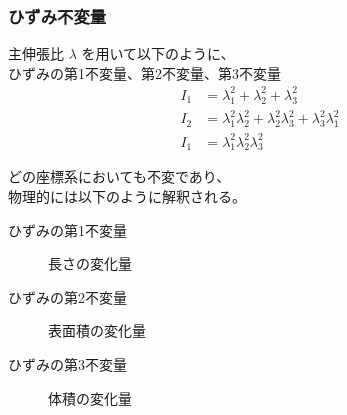 \documentclass[12pt, dvipdfmx]{beamer}
\begin{document}
\begin{frame}
	\frametitle{ひずみ不変量}

	主伸張比 $\lambda$ を用いて以下のように、\\ひずみの第1不変量、第2不変量、第3不変量
		\begin{align*}
			I_1 &= \lambda_1^2 + \lambda_2^2 + \lambda_3^2 \\
			I_2 &= \lambda_1^2\lambda_2^2 + \lambda_2^2\lambda_3^2 + \lambda_3^2\lambda_1^2 \\
			I_1 &= \lambda_1^2\lambda_2^2\lambda_3^2
		\end{align*}

	どの座標系においても不変であり、\\物理的には以下のように解釈される。
	\begin{description}
		\item [ひずみの第1不変量]
		長さの変化量
		\item [ひずみの第2不変量]
		表面積の変化量
		\item [ひずみの第3不変量]
		体積の変化量
	\end{description}
\end{frame}
\end{document}
